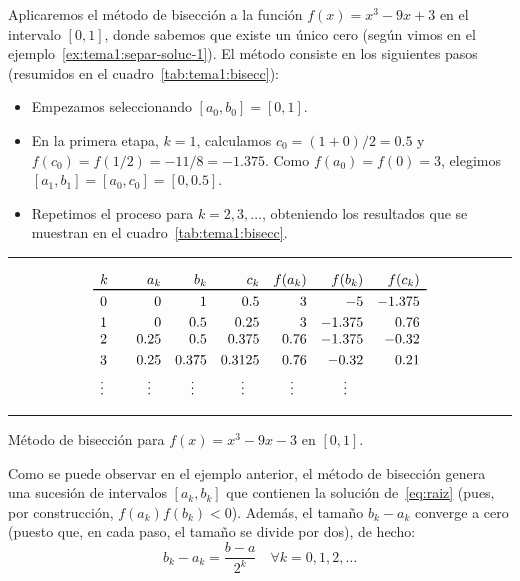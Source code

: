 \begin{example}
  Aplicaremos el método de bisección a la función $f(x)=x^3-9x+3$ en el intervalo
  $[0,1]$, donde sabemos que existe un único cero (según vimos en el
  ejemplo~\ref{ex:tema1:separ-soluc-1}). El método consiste en los
  siguientes pasos (resumidos en el cuadro~\ref{tab:tema1:bisecc}):

  \begin{itemize}
  \item Empezamos seleccionando $[a_0,b_0]=[0,1]$.
  \item En la primera etapa, $k=1$, calculamos
    $c_0=(1+0)/2=0.5$  y
    $f(c_0)=f(1/2)=-11/8=-1.375$. Como $f(a_0)=f(0)=3$, elegimos
    $[a_1,b_1]=[a_0,c_0]=[0,0.5]$.
  \item Repetimos el proceso para $k=2,3,\dots$, obteniendo los resultados que se
    muestran en el cuadro~\ref{tab:tema1:bisecc}.
  \end{itemize}

\end{example}
\begin{table}
  \centering
  \rule{0.99\linewidth}{1.6pt}
  \begin{equation*}
    \begin{array}{l<{\quad}rrrrrr}%
      k &  a_k & b_k & c_k & f(a_k) & f(b_k) & f(c_k)
      \\ \toprule%
      0 & 0 &1  &  0.5 & 3 & -5 & -1.375
      \\ \noalign{\smallskip}
      1 &  0& 0.5 &  0.25 & 3 & -1.375 & 0.76
      \\ \smallskip
      2 & 0.25 & 0.5 & 0.375 & 0.76 & -1.375 & -0.32
      \\ \smallskip
      3& 0.25 & 0.375 & 0.3125 & 0.76 & -0.32 & 0.21
      \\
      \hfill \vdots \hfill~ & \hfill \vdots \hfill~ &
                                                      \hfill \vdots \hfill~ & \hfill \vdots \hfill~ &
                                                                                                      \hfill \vdots \hfill~ & \hfill \vdots \hfill~
    \end{array}
  \end{equation*}
  \rule{0.99\linewidth}{1.5pt}
  \caption{Método de bisección para $f(x)=x^3-9x-3$ en $[0,1]$.}
  \label{tab:tema1:bisecc}
\end{table}

Como se puede observar en el ejemplo anterior, el método de bisección
genera una sucesión de intervalos $[a_k,b_k]$ que
contienen la solución de~\eqref{eq:raiz} (pues, por construcción,
$f(a_k)f(b_k)<0$). Además, el tamaño $b_k-a_k$ converge a cero (puesto
que, en cada paso, el tamaño se divide por dos), de hecho:
\begin{equation}
  \label{eq:tema1:bisec:1}
  b_k-a_k = \frac{b-a}{2^k} \quad \forall k=0,1,2,\dots
\end{equation}

